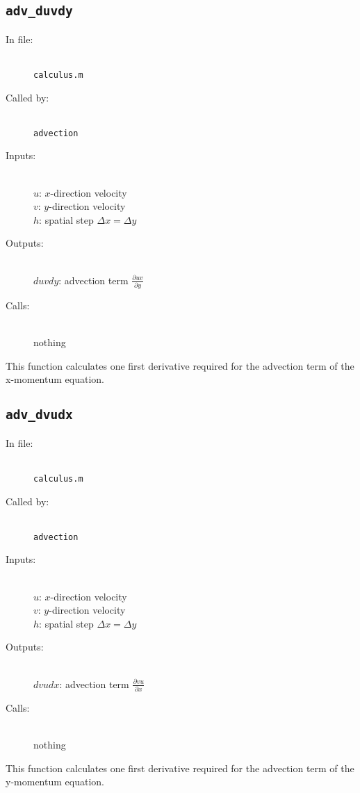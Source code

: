 \documentclass[12pt]{article}
\begin{document}
\subsection{\texttt{adv\_duvdy}}
\begin{description}
\item[In file:] \hfill \\ \texttt{calculus.m}
\item[Called by:] \hfill \\ \texttt{advection}
\item[Inputs:] \hfill \\ $u$: $x$-direction velocity \\ $v$: $y$-direction velocity \\$h$: spatial step $\Delta x = \Delta y$
\item[Outputs:] \hfill \\ $duvdy$: advection term $\frac{\partial uv}{\partial y}$
\item[Calls:] \hfill \\ nothing
\end{description}
This function calculates one first derivative required for the advection term of the x-momentum equation.

\subsection{\texttt{adv\_dvudx}}
\begin{description}
\item[In file:] \hfill \\ \texttt{calculus.m}
\item[Called by:] \hfill \\ \texttt{advection}
\item[Inputs:] \hfill \\ $u$: $x$-direction velocity \\ $v$: $y$-direction velocity \\$h$: spatial step $\Delta x = \Delta y$
\item[Outputs:] \hfill \\ $dvudx$: advection term $\frac{\partial vu}{\partial x}$
\item[Calls:] \hfill \\ nothing
\end{description}
This function calculates one first derivative required for the advection term of the y-momentum equation.
\end{document}
